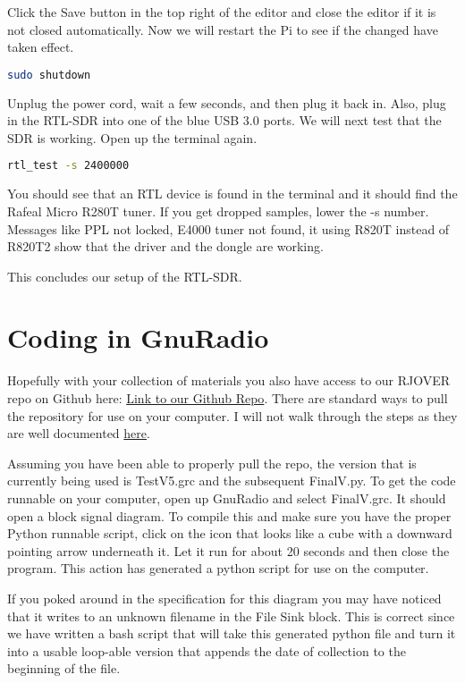 \documentclass[letterpaper,12pt,notitlepage]{report} %
\begin{document}
Click the Save button in the top right of the editor and close the editor if it is not closed automatically. Now we will restart the Pi to see if the changed have taken effect.

\begin{lstlisting}[language=bash]
	sudo shutdown
\end{lstlisting}

Unplug the power cord, wait a few seconds, and then plug it back in. Also, plug in the RTL-SDR into one of the blue USB 3.0 ports. We will next test that the SDR is working. Open up the terminal again.

\begin{lstlisting}[language=bash]
	rtl_test -s 2400000
\end{lstlisting}

You should see that an RTL device is found in the terminal and it should find the Rafeal Micro R280T tuner. If you get dropped samples, lower the -s number. Messages like PPL not locked, E4000 tuner not found, it using R820T instead of R820T2 show that the driver and the dongle are working.

This concludes our setup of the RTL-SDR. 

\section{Coding in GnuRadio}

Hopefully with your collection of materials you also have access to our RJOVER repo on Github here: \href{https://github.com/tjk144/RJOVER}{Link to our Github Repo}. There are standard ways to pull the repository for use on your computer. I will not walk through the steps as they are well documented \href{https://docs.github.com/en/github/authenticating-to-github/connecting-to-github-with-ssh}{here}.

Assuming you have been able to properly pull the repo, the version that is currently being used is TestV5.grc and the subsequent FinalV.py. To get the code runnable on your computer, open up GnuRadio and select FinalV.grc. It should open a block signal diagram. To compile this and make sure you have the proper Python runnable script, click on the icon that looks like a cube with a downward pointing arrow underneath it. Let it run for about 20 seconds and then close the program. This action has generated a python script for use on the computer.

If you poked around in the specification for this diagram you may have noticed that it writes to an unknown filename in the File Sink block. This is correct since we have written a bash script that will take this generated python file and turn it into a usable loop-able version that appends the date of collection to the beginning of the file.
\end{document}
